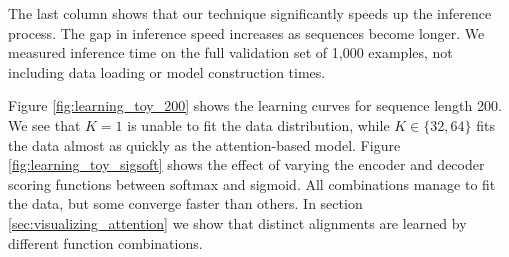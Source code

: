 \documentclass[11pt,letterpaper]{article}
\begin{document}
The last column shows that our technique significantly speeds up the inference process. The gap in inference speed increases as sequences become longer. We measured inference time on the full validation set of 1,000 examples, not including data loading or model construction times.

Figure \ref{fig:learning_toy_200} shows the learning curves for sequence length 200. We see that $K=1$ is unable to fit the data distribution, while $K\in\{32, 64\}$ fits the data almost as quickly as the attention-based model. Figure \ref{fig:learning_toy_sigsoft} shows the effect of varying the encoder and decoder scoring functions between softmax and sigmoid. All combinations manage to fit the data, but some converge faster than others. In section \ref{sec:visualizing_attention} we show that distinct alignments are learned by different function combinations.

\end{document}
